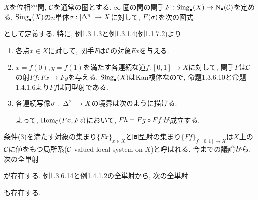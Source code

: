 \documentclass[uplatex, a4paper, 14Q, dvipdfmx]{jsreport}
\begin{document}
\begin{example}
  $X$を位相空間, $\mathcal{C}$を通常の圏とする. 
  $\infty$-圏の間の関手$F: \mathrm{Sing}_\bullet(X) \to \mathrm{N}_{\bullet}(\mathcal{C})$を定める. 
  $\mathrm{Sing}_\bullet(X)$の$n$単体$\sigma: |\Delta^n| \to X$に対して, $F(\sigma)$を次の図式
  \begin{center}
  \end{center}
  として定義する. 
  特に, 例1.3.1.3と例1.3.1.4(例1.1.7.2)より
  \begin{enumerate}
    \item 
    各点$x \in X$に対して, 関手$F$は$\mathcal{C}$の対象$Fx$を与える. 
    \item 
    $x=f(0), y=f(1)$を満たす各連続な道$f: [0,1] \to X$に対して, 関手$F$は$\mathcal{C}$の射$Ff: Fx \to Fy$を与える. 
    $\mathrm{Sing}_\bullet(X)$はKan複体なので, 命題1.3.6.10と命題1.4.1.6より$Ff$は同型射である. 
    \item 
    各連続写像$\sigma: |\Delta^2| \to X$の境界は次のように描ける. 
    \begin{center}
    \end{center}
    よって, $\mathrm{Hom}_{\mathcal{C}}(Fx,Fz)$において, $Fh=Fg \circ Ff$が成立する. 
  \end{enumerate}
  条件(3)を満たす対象の集まり$\{Fx\}_{x \in X}$と同型射の集まり$\{Ff\}_{f: [0,1] \to X}$は$X$上の$\mathcal{C}$に値をもつ局所系($\mathcal{C}$-valued local system on $X$)と呼ばれる. 
  今までの議論から, 次の全単射
  \begin{center}
  \end{center}
  が存在する. 
  例1.3.6.14と例1.4.1.2の全単射から, 次の全単射 
  \begin{center}
  \end{center}
  も存在する.
\end{example}
\end{document}
